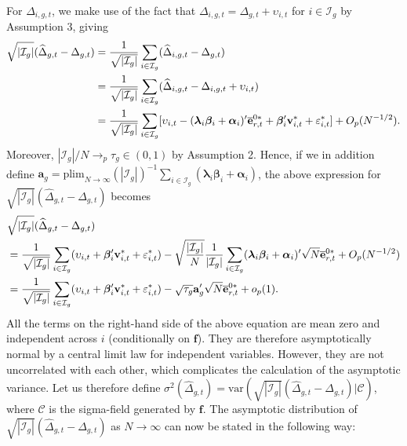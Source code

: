 \documentclass[12pt,fleqn]{article}
\def\*#1{\mathbf{#1}}
\def\+#1{\boldsymbol{#1}}
\begin{document}
For $\Delta_{i,g,t}$, we make use of the fact that $\Delta_{i,g,t}= \Delta_{g,t} + \upsilon_{i,t}$ for $i\in \mathcal{I}_g$ by Assumption 3, giving
\begin{align}
 \sqrt{|\mathcal{I}_g|}(\widehat \Delta_{g,t} - \Delta_{g,t}) & = \frac{1}{\sqrt{|\mathcal{I}_g|}} \sum_{i\in \mathcal{I}_g} (\widehat \Delta_{i,g,t} - \Delta_{g,t}) \notag\\
& = \frac{1}{\sqrt{|\mathcal{I}_g|}} \sum_{i\in \mathcal{I}_g} (\widehat \Delta_{i,g,t} - \Delta_{i,g,t} + \upsilon_{i,t}) \notag\\
& = \frac{1}{\sqrt{|\mathcal{I}_g|}} \sum_{i\in \mathcal{I}_g} [\upsilon_{i,t} - (\+\lambda_i\+\beta_i + \+\alpha_i)'\overline{\*e}_{r,t}^{0\ast} + \+\beta_i'\*v_{i,t}^* + \varepsilon_{i,t}^* ] + O_p(N^{-1/2}) .
\end{align}
Moreover, $|\mathcal{I}_g|/N \to_p \tau_g \in (0,1)$ by Assumption 2. Hence, if we in addition define $\*a_g = \mathrm{plim}_{N\to\infty} (|\mathcal{I}_g|)^{-1} \sum_{i\in \mathcal{I}_g}(\+\lambda_i\+\beta_i + \+\alpha_i)$, the above expression for $\sqrt{|\mathcal{I}_g|}(\widehat \Delta_{g,t} - \Delta_{g,t})$ becomes
\begin{align}
& \sqrt{|\mathcal{I}_g|}(\widehat \Delta_{g,t} - \Delta_{g,t}) \notag\\
&= \frac{1}{\sqrt{|\mathcal{I}_g|}}\sum_{i\in \mathcal{I}_g}(\upsilon_{i,t}  + \+\beta_i'\*v_{i,t}^* + \varepsilon_{i,t}^*) - \sqrt{\frac{|\mathcal{I}_g|}{N}} \frac{1}{|\mathcal{I}_g|}\sum_{i\in \mathcal{I}_g} (\+\lambda_i\+\beta_i + \+\alpha_i)'\sqrt{N}\overline{\*e}_{r,t}^{0\ast} + O_p(N^{-1/2}) \notag\\
&= \frac{1}{\sqrt{|\mathcal{I}_g|}}\sum_{i\in \mathcal{I}_g} (\upsilon_{i,t}  + \+\beta_i'\*v_{i,t}^* + \varepsilon_{i,t}^* ) - \sqrt{\tau_g}\*a_g'\sqrt{N}\overline{\*e}_{r,t}^{0*} + o_p(1).
\end{align}
All the terms on the right-hand side of the above equation are mean zero and independent across $i$ (conditionally on $\*f$). They are therefore asymptotically normal by a central limit law for independent variables. However, they are not uncorrelated with each other, which complicates the calculation of the asymptotic variance. Let us therefore define $\sigma^2(\widehat \Delta_{g,t}) = \mathrm{var}(\sqrt{|\mathcal{I}_g|}(\widehat \Delta_{g,t} - \Delta_{g,t})  |\mathcal{C})$, where $\mathcal{C}$ is the sigma-field generated by $\*f$. The asymptotic distribution of $\sqrt{|\mathcal{I}_g|}(\widehat \Delta_{g,t} - \Delta_{g,t})$ as $N\to\infty$ can now be stated in the following way:
\end{document}
